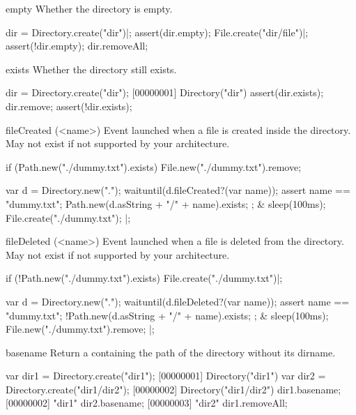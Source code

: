 \begin{urbiscriptapi}
\item[empty]
  Whether the directory is empty.
\begin{urbiscript}
dir = Directory.create("dir")|;
assert(dir.empty);
File.create("dir/file")|;
assert(!dir.empty);
dir.removeAll;
\end{urbiscript}

\item[exists]
  Whether the directory still exists.
\begin{urbiscript}
dir = Directory.create("dir");
[00000001] Directory("dir")
assert(dir.exists);
dir.remove;
assert(!dir.exists);
\end{urbiscript}

\item[fileCreated](<name>)%
  Event launched when a file is created inside the directory.
  May not exist if not supported by your architecture.

\begin{urbiscript}[firstnumber=1]
if (Path.new("./dummy.txt").exists)
  File.new("./dummy.txt").remove;

  {
    var d = Directory.new(".");
    waituntil(d.fileCreated?(var name));
    assert
    {
      name == "dummy.txt";
      Path.new(d.asString + "/" + name).exists;
    };
  }
&
  {
    sleep(100ms);
    File.create("./dummy.txt");
  }|;
\end{urbiscript}

\item[fileDeleted](<name>)%
  Event launched when a file is deleted from the directory.  May not exist
  if not supported by your architecture.

\begin{urbiscript}
if (!Path.new("./dummy.txt").exists)
  File.create("./dummy.txt")|;

  {
    var d = Directory.new(".");
    waituntil(d.fileDeleted?(var name));
    assert
    {
      name == "dummy.txt";
      !Path.new(d.asString + "/" + name).exists;
    };
  }
&
  {
    sleep(100ms);
    File.new("./dummy.txt").remove;
  }|;
\end{urbiscript}

\item[basename]
  Return a  containing the path of the directory without
  its dirname.
\begin{urbiscript}[firstnumber=1]
var dir1 = Directory.create("dir1");
[00000001] Directory("dir1")
var dir2 = Directory.create("dir1/dir2");
[00000002] Directory("dir1/dir2")
dir1.basename;
[00000002] "dir1"
dir2.basename;
[00000003] "dir2"
dir1.removeAll;
\end{urbiscript}


\end{urbiscriptapi}
